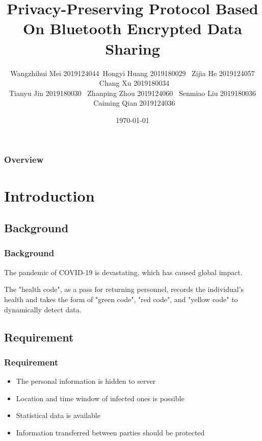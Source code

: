 \documentclass{beamer}
\title[Short title]{Privacy-Preserving Protocol Based On Bluetooth Encrypted Data Sharing} %
\author{ Wangzhihui Mei 2019124044\ Hongyi Huang 2019180029 \ Zijia He 2019124057 \ Chang Xu 2019180034\\ Tianyu Jin 2019180030 \ Zhanping Zhou 2019124060 \ Senmiao Liu 2019180036 \ Caiming Qian 2019124036} %
\institute[JI] %
{
CCNU-UOW JI \\ %
\medskip
\textit{maywzh@gmail.com} %
}
\date{\today} %
\begin{document}
\begin{frame}
\titlepage %
\end{frame}

\begin{frame}
\frametitle{Overview} %
\tableofcontents %
\end{frame}


\section{Introduction}
\subsection{Background}
\begin{frame}
  \frametitle{Background}
  The pandemic of COVID-19 is devastating, which has caused global impact.

  The "health code", as a pass for returning personnel, records the individual’s health and takes the form of "green code", "red code", and "yellow code" to dynamically detect data. 

\end{frame}

\subsection{Requirement}
\begin{frame}
  \frametitle{Requirement}
  \begin{itemize}
    \item The personal information is hidden to server
    \item Location and time window of infected ones is possible
    \item Statistical data is available
    \item Information transferred between parties should be protected
  \end{itemize}

\end{frame}
\end{document}
